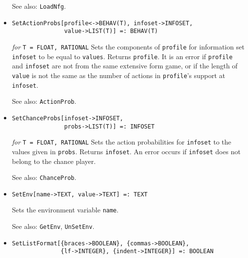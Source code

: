 \begin{itemize}
{\it for} {\tt T = FLOAT, RATIONAL}
\bd
Writes \verb+nfg+ to an external savefile \verb+file+.  It is an
error if \verb+file+ cannot be opened for writing.  Returns \verb+nfg+.
\item [See also:] \verb+LoadNfg+.
\ed

\item{}
\protect \large \begin{verbatim} 
SetActionProbs[profile<->BEHAV(T), infoset->INFOSET,
               value->LIST(T)] =: BEHAV(T) 
\end{verbatim}\normalsize

{\it for} {\tt T = FLOAT, RATIONAL}
\bd
Sets the components of \verb+profile+ for
information set \verb+infoset+ to be equal to \verb+values+.
Returns \verb+profile+.  It is an error if \verb+profile+ and \verb+infoset+
are not from the same extensive form game, or if the length of
\verb+value+ is not the same as the number of actions in \verb+profile+'s
support at \verb+infoset+.
\item [See also:] \verb+ActionProb+.
\ed

\item{}
\protect \large \begin{verbatim} 
SetChanceProbs[infoset->INFOSET, 
               probs->LIST(T)] =: INFOSET
\end{verbatim}\normalsize

{\it for} {\tt T = FLOAT, RATIONAL}
\bd
Sets the action probabilities for 
\verb+infoset+ to the values given in \verb+probs+.  Returns \verb+infoset+. 
An error occurs if \verb+infoset+ does not belong to the chance player.
\item [See also:] \verb+ChanceProb+.
\ed

\item{}
\protect \large \begin{verbatim}
SetEnv[name->TEXT, value->TEXT] =: TEXT
\end{verbatim} \normalsize

\bd
Sets the environment variable \verb+name+.
\item [See also:] \verb+GetEnv+, \verb+UnSetEnv+.
\ed

\item{}
\protect \large \begin{verbatim}
SetListFormat[{braces->BOOLEAN}, {commas->BOOLEAN},
              {lf->INTEGER}, {indent->INTEGER}] =: BOOLEAN
\end{verbatim} \normalsize


\end{itemize}
